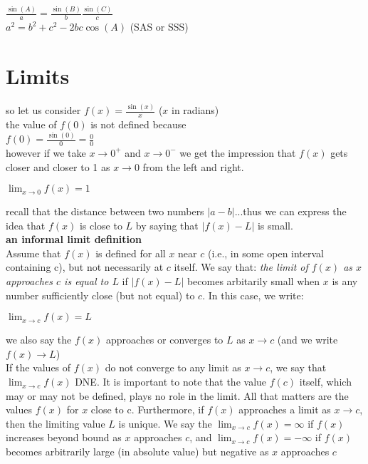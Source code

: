 \documentclass{article}
\begin{document}
	$\frac{\sin(A)}{a} = \frac{\sin(B)}{b} \frac{\sin(C)}{c}$\\
	$a^2 = b^2 + c^2 - 2bc\cos(A)$ (SAS or SSS)

\newpage
\section*{Limits}
	so let us consider $f(x) = \frac{\sin(x)}{x}$ ($x$ in radians)\\
	the value of $f(0)$ is not defined because\\
	$f(0) = \frac{\sin(0)}{0} = \frac{0}{0}$\\
	however if we take $x \to 0^{+}$ and $x \to 0^{-}$ we get the impression that $f(x)$ gets closer and closer to 1 as $x \to 0$ from the left and right.
	\begin{center}
		$\lim_{x \to 0}f(x) = 1$
	\end{center}
	recall that the distance between two numbers $\lvert a - b\rvert$...thus we can express the idea that $f(x)$ is close to $L$ by saying that $\lvert f(x) - L\rvert$ is small.\\

\textbf{an informal limit definition}\\
	Assume that $f(x)$ is defined for all $x$ near $c$ (i.e., in some open interval containing c), but not necessarily at $c$ itself. We say that: \textit{the limit of $f(x)$ as $x$ approaches $c$ is equal to $L$} if $\lvert f(x) - L\rvert$ becomes arbitarily small when $x$ is any number sufficiently close (but not equal) to $c$. In this case, we write:
	\begin{center}
		$\lim_{x \to c}f(x) = L$
	\end{center}
	we also say the $f(x)$ approaches or converges to $L$ as $x \to c$ (and we write $f(x) \to L$)\\

	If the values of $f(x)$ do not converge to any limit as $x \to c$, we say that $\lim_{x \to c}f(x)$ DNE. It is important to note that the value $f(c)$ itself, which may or may not be defined, plays no role in the limit. All that matters are the values $f(x)$ for $x$ close to c. Furthermore, if $f(x)$ approaches a limit as $x \to c$, then the limiting value $L$ is unique. We say the $\lim_{x \to c}f(x) = \infty$ if $f(x)$ increases beyond bound as $x$ approaches $c$, and $\lim_{x \to c}f(x) = -\infty$ if $f(x)$ becomes arbitrarily large (in absolute value) but negative as $x$ approaches $c$\\
\end{document}
